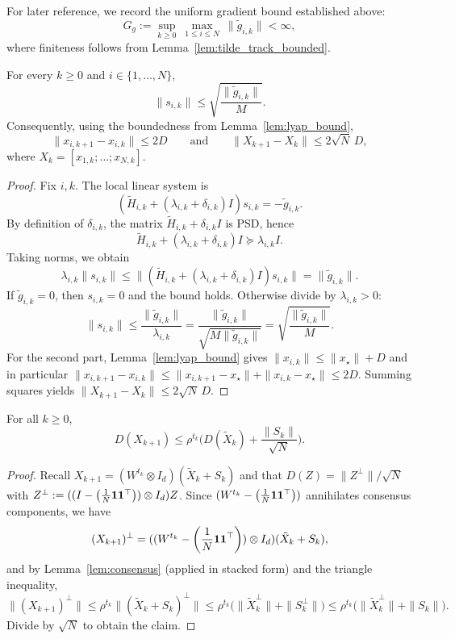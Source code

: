 \documentclass[review,onefignum,onetabnum]{siamart171218}
\begin{document}
For later reference, we record the uniform gradient bound established above:
\begin{equation}\label{eq:step_unif_app}
G_g:=\sup_{k\ge 0}\ \max_{1\le i\le N}\ \|\tilde g_{i,k}\| < \infty,
\end{equation}
where finiteness follows from Lemma~\ref{lem:tilde_track_bounded}.


\begin{lemma}\label{lem:step_bound_app}
For every $k\ge0$ and $i\in\{1,\dots,N\}$,
\[
\|s_{i,k}\|\le \sqrt{\frac{\|\tilde g_{i,k}\|}{M}}.
\]
Consequently, using the boundedness from Lemma~\ref{lem:lyap_bound},
\[
\|x_{i,k+1}-x_{i,k}\|\le 2D
\qquad\text{and}\qquad
\|X_{k+1}-X_k\|\le 2\sqrt N\,D,
\]
where $X_k=[x_{1,k};\dots;x_{N,k}]$.
\end{lemma}
\begin{proof}
Fix $i,k$. The local linear system is
\[
(\tilde H_{i,k}+(\lambda_{i,k}+\delta_{i,k})I)s_{i,k}=-\tilde g_{i,k}.
\]
By definition of $\delta_{i,k}$, the matrix $\tilde H_{i,k}+\delta_{i,k}I$ is PSD, hence
\[
\tilde H_{i,k}+(\lambda_{i,k}+\delta_{i,k})I \succeq \lambda_{i,k}I.
\]
Taking norms, we obtain
\[
\lambda_{i,k}\|s_{i,k}\|\le \|(\tilde H_{i,k}+(\lambda_{i,k}+\delta_{i,k})I)s_{i,k}\|=\|\tilde g_{i,k}\|.
\]
If $\tilde g_{i,k}=0$, then $s_{i,k}=0$ and the bound holds. Otherwise divide by $\lambda_{i,k}>0$:
\[
\|s_{i,k}\|\le \frac{\|\tilde g_{i,k}\|}{\lambda_{i,k}}
=\frac{\|\tilde g_{i,k}\|}{\sqrt{M\|\tilde g_{i,k}\|}}
=\sqrt{\frac{\|\tilde g_{i,k}\|}{M}}.
\]
For the second part, Lemma~\ref{lem:lyap_bound} gives $\|x_{i,k}\|\le \|x_\star\|+D$ and in particular
$\|x_{i,k+1}-x_{i,k}\|\le \|x_{i,k+1}-x_\star\|+\|x_{i,k}-x_\star\|\le 2D$.
Summing squares yields $\|X_{k+1}-X_k\|\le 2\sqrt N\,D$.
\end{proof}

\begin{lemma}\label{lem:DX_post}
For all $k\ge 0$,
\[
D(X_{k+1})\le \rho^{t_k}\Big(D(\tilde X_k)+\frac{\|S_k\|}{\sqrt N}\Big).
\]
\end{lemma}
\begin{proof}
Recall $X_{k+1}=(W^{t_k}\otimes I_d)(\tilde X_k+S_k)$ and that $D(Z)=\|Z^\perp\|/\sqrt N$ with $Z^\perp:=((I-\left(\frac{1}{N}\mathbf{1}\mathbf{1}^\top\right))\otimes I_d)Z$.
Since $(W^{t_k}-\left(\frac{1}{N}\mathbf{1}\mathbf{1}^\top\right))$ annihilates consensus components, we have
\[
(X_{k+1})^\perp = ((W^{t_k}-\left(\frac{1}{N}\mathbf{1}\mathbf{1}^\top\right))\otimes I_d)(\tilde X_k+S_k),
\]
and by Lemma~\ref{lem:consensus} (applied in stacked form) and the triangle inequality,
\[
\| (X_{k+1})^\perp\|
\le \rho^{t_k}\|(\tilde X_k+S_k)^\perp\|
\le \rho^{t_k}\big(\|\tilde X_k^\perp\|+\|S_k^\perp\|\big)
\le \rho^{t_k}\big(\|\tilde X_k^\perp\|+\|S_k\|\big).
\]
Divide by $\sqrt N$ to obtain the claim.
\end{proof}
\end{document}
